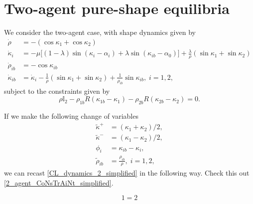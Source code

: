 \section{Two-agent pure-shape equilibria}

We consider the two-agent case, with shape dynamics given by
\begin{equation}
\begin{aligned}
\dot{\rho} &= - (\cos\kappa_1 + \cos\kappa_2) 
\\
\dot{\kappa}_i &= - \mu \Big[(1 - \lambda)\sin(\kappa_i - \alpha_i) + \lambda \sin(\kappa_{ib} - \alpha_0) \Big] + \frac{\lambda}{\rho}(\sin\kappa_1 + \sin\kappa_2) 
\\
\dot{\rho}_{ib} &= - \cos\kappa_{ib}  
\\
\dot{\kappa}_{ib} &= \dot{\kappa}_i - \frac{1}{\rho}(\sin\kappa_1 + \sin\kappa_2) + \frac{1}{\rho_{ib}} \sin\kappa_{ib},  \; i=1,2,
\end{aligned}
\label{CL_dynamics_2_simplified}
\end{equation}
subject to the constraints given by
\begin{equation}
\rho \mathbb{I}_2 - \rho_{1b} R(\kappa_{1b} - \kappa_1) - \rho_{2b} R(\kappa_{2b} - \kappa_{2}) = 0. 
\label{2_agent_CoNsTrAiNt_simplified}
\end{equation}

If we make the following change of variables
\begin{align}
\tilde{\kappa}^+ 
&= (\kappa_1 + \kappa_2)/2,
\\
\tilde{\kappa}^- 
&= 
(\kappa_1 - \kappa_2)/2,
\\
\phi_{i} 
&= 
\kappa_{ib} - \kappa_i,
\\
\tilde{\rho}_{ib} 
&= 
\frac{\rho_{ib} }{\rho}, 
\; i=1,2,
\end{align}
we can recast \eqref{CL_dynamics_2_simplified} in the following way. Check this out \eqref{2_agent_CoNsTrAiNt_simplified}.


\begin{equation}
1 = 2 
\end{equation}
  
  